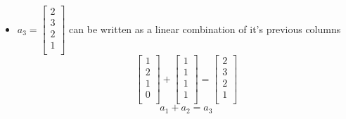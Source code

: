 \documentclass{article}
\begin{document}
\begin{itemize}
  \item $a_3=
          \begin{bmatrix}
            2 \\
            3 \\
            2 \\
            1 \\
          \end{bmatrix}
        $ can be written as a linear combination of it's previous columns
        $$
          \begin{bmatrix}
            1 \\
            2 \\
            1 \\
            0 \\
          \end{bmatrix}+\begin{bmatrix}
            1 \\
            1 \\
            1 \\
            1 \\
          \end{bmatrix}=\begin{bmatrix}
            2 \\
            3 \\
            2 \\
            1 \\
          \end{bmatrix}
        $$
        $$
          a_1+a_2=a_3
        $$


\end{itemize}
\end{document}
